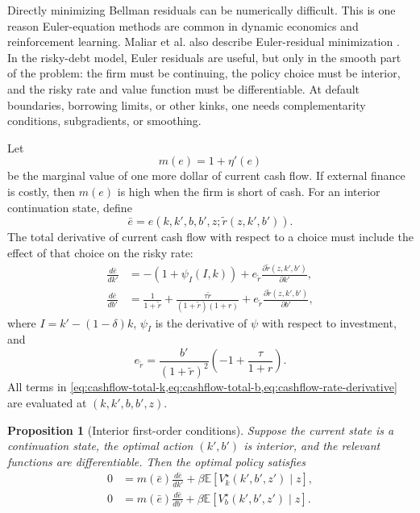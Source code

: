 \documentclass[11pt]{article}
\newtheorem{proposition}{Proposition}
\newcommand{\E}{\mathbb{E}}
\newcommand{\1}{\mathbf{1}}
\begin{document}
Directly minimizing Bellman residuals can be numerically difficult. This is one
reason Euler-equation methods are common in dynamic economics and reinforcement
learning. Maliar et al. also describe Euler-residual minimization
\citep[Definitions 2.6 and 2.7]{maliar2021deep}. In the risky-debt model, Euler
residuals are useful, but only in the smooth part of the problem: the firm must
be continuing, the policy choice must be interior, and the risky rate and value
function must be differentiable. At default boundaries, borrowing limits, or
other kinks, one needs complementarity conditions, subgradients, or smoothing.

Let
\[
  m(e)=1+\eta'(e)
\]
be the marginal value of one more dollar of current cash flow. If external
finance is costly, then \(m(e)\) is high when the firm is short of cash. For an
interior continuation state, define
\[
  \bar e
  =
  e(k,k',b,b',z;\widetilde r(z,k',b')).
\]
The total derivative of current cash flow with respect to a choice must include
the effect of that choice on the risky rate:
\begin{align}
  \frac{d\bar e}{dk'}
  &=
  -(1+\psi_I(I,k))
  +e_{\widetilde r}\frac{\partial \widetilde r(z,k',b')}{\partial k'},
  \label{eq:cashflow-total-k}\\
  \frac{d\bar e}{db'}
  &=
  \frac{1}{1+\widetilde r}
  +\frac{\tau\widetilde r}{(1+\widetilde r)(1+r)}
  +e_{\widetilde r}\frac{\partial \widetilde r(z,k',b')}{\partial b'},
  \label{eq:cashflow-total-b}
\end{align}
where \(I=k'-(1-\delta)k\), \(\psi_I\) is the derivative of \(\psi\) with
respect to investment, and
\begin{equation}
  e_{\widetilde r}
  =
  \frac{b'}{(1+\widetilde r)^2}
  \left(-1+\frac{\tau}{1+r}\right).
  \label{eq:cashflow-rate-derivative}
\end{equation}
All terms in \cref{eq:cashflow-total-k,eq:cashflow-total-b,eq:cashflow-rate-derivative}
are evaluated at \((k,k',b,b',z)\).

\begin{proposition}[Interior first-order conditions]
\label{prop:interior-foc}
Suppose the current state is a continuation state, the optimal action
\((k',b')\) is interior, and the relevant functions are differentiable. Then the
optimal policy satisfies
\begin{align}
  0
  &=
  m(\bar e)\frac{d\bar e}{dk'}
  +\beta \E[V^\star_k(k',b',z')\mid z],
  \label{eq:foc-k}\\
  0
  &=
  m(\bar e)\frac{d\bar e}{db'}
  +\beta \E[V^\star_b(k',b',z')\mid z].
  \label{eq:foc-b}
\end{align}
\end{proposition}
\end{document}

